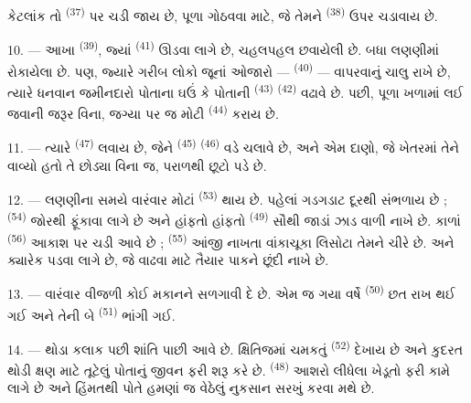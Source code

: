 કેટલાંક તો  \textsuperscript{(37)} પર ચડી જાય છે, પૂળા
ગોઠવવા માટે, જે તેમને  \textsuperscript{(38)} ઉપર
ચડાવાય છે.

10. --- આખા  \textsuperscript{(39)}, જ્યાં
 \textsuperscript{(41)} ઊડવા લાગે છે, ચહલપહલ છવાયેલી છે.
બધા લણણીમાં રોકાયેલા છે. પણ, જ્યારે ગરીબ લોકો જૂનાં ઓજારો —
\textsuperscript{(40)} — વાપરવાનું ચાલુ રાખે છે, ત્યારે ધનવાન જમીનદારો
પોતાના ઘઉં કે પોતાની  \textsuperscript{(43)}  \textsuperscript{(42)} વઢાવે છે. પછી, પૂળા ખળામાં લઈ જવાની જરૂર
વિના, જગ્યા પર જ મોટી  \textsuperscript{(44)} કરાય છે.

11. --- ત્યારે  \textsuperscript{(47)} લવાય છે,
જેને  \textsuperscript{(45)} 
\textsuperscript{(46)} વડે ચલાવે છે, અને એમ દાણો, જે ખેતરમાં તેને વાવ્યો
હતો તે છોડ્યા વિના જ, પરાળથી છૂટો પડે છે.

\VUsaut{5.0mm}
\VUsaut{3.4mm}

12. --- લણણીના સમયે વારંવાર મોટાં 
\textsuperscript{(53)} થાય છે. પહેલાં  ગડગડાટ દૂરથી
સંભળાય છે ;  \textsuperscript{(54)} જોરથી ફૂંકાવા
લાગે છે અને હાંફતો હાંફતો  \textsuperscript{(49)} સૌથી
જાડાં ઝાડ વાળી નાખે છે. કાળાં  \textsuperscript{(56)}
આકાશ પર ચડી આવે છે ;  \textsuperscript{(55)} આંજી નાખતા
વાંકાચૂકા લિસોટા તેમને ચીરે છે.  અને ક્યારેક
 પડવા લાગે છે, જે વાઢવા માટે તૈયાર પાકને છૂંદી નાખે છે.

13. --- વારંવાર વીજળી કોઈ મકાનને સળગાવી દે છે. એમ જ ગયા વર્ષે
 \textsuperscript{(50)} છત રાખ થઈ ગઈ અને તેની બે
 \textsuperscript{(51)} ભાંગી ગઈ.

14. --- થોડા કલાક પછી શાંતિ પાછી આવે છે. ક્ષિતિજમાં ચમકતું
 \textsuperscript{(52)} દેખાય છે અને કુદરત થોડી ક્ષણ માટે
તૂટેલું પોતાનું જીવન ફરી શરૂ કરે છે. 
\textsuperscript{(48)} આશરો લીધેલા ખેડૂતો ફરી કામે લાગે છે અને હિંમતથી
પોતે હમણાં જ વેઠેલું નુકસાન સરખું કરવા મથે છે.

\VUsaut{6.0mm}
\VUsaut{3.6mm}

\VUsaut{1.4mm}
\VUsaut{4.0mm}

